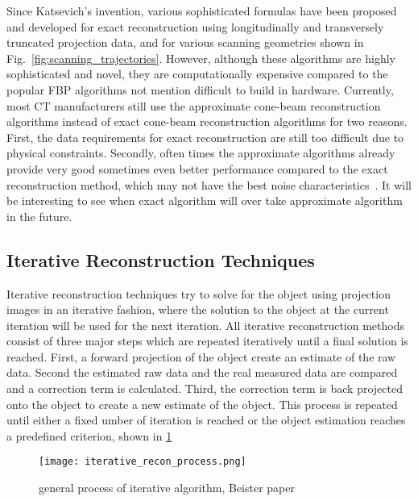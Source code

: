 Since Katsevich's invention, various sophisticated formulas have been proposed and developed for exact reconstruction using longitudinally and transversely truncated projection data, and for various scanning geometries shown in Fig.~\ref{fig:scanning_trajectories}.  However, although these algorithms are highly sophisticated and novel, they are computationally expensive compared to the popular FBP algorithms not mention difficult to build in hardware.  Currently, most CT manufacturers still use the approximate cone-beam reconstruction algorithms instead of exact cone-beam reconstruction algorithms for two reasons.  First, the data requirements for exact reconstruction are still too difficult due to physical constraints.  Secondly, often times the approximate algorithms already provide very good sometimes even better performance compared to the exact reconstruction method, which may not have the best noise characteristics~\citep{Wang2008}.  It will be interesting to see when exact algorithm will over take approximate algorithm in the future.

\subsection{Iterative Reconstruction Techniques}
Iterative reconstruction techniques try to solve for the object using projection images in an iterative fashion, where the solution to the object at the current iteration will be used for the next iteration.  All iterative reconstruction methods consist of three major steps which are repeated iteratively until a final solution is reached.  First, a forward projection of the object create an estimate of the raw data.  Second the estimated raw data and the real measured data are compared and a correction term is calculated.  Third, the correction term is back projected onto the object to create a new estimate of the object.  This process is repeated until either a fixed umber of iteration is reached or the object estimation reaches a predefined criterion, shown in \ref{fig:generalIR}

\begin{figure}
\centering
\texttt{[image: iterative\_recon\_process.png]}
\caption{general process of iterative algorithm, Beister paper}
\label{fig:generalIR}
\end{figure}

